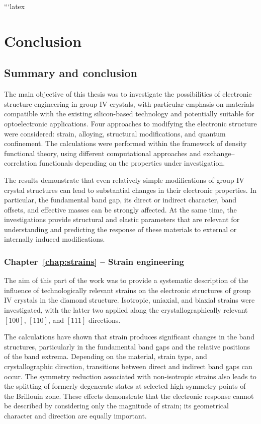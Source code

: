 ```latex
\chapter*{Conclusion}

\section*{Summary and conclusion}

The main objective of this thesis was to investigate the possibilities of electronic structure engineering in group IV crystals, with particular emphasis on materials compatible with the existing silicon-based technology and potentially suitable for optoelectronic applications. Four approaches to modifying the electronic structure were considered: strain, alloying, structural modifications, and quantum confinement. The calculations were performed within the framework of density functional theory, using different computational approaches and exchange--correlation functionals depending on the properties under investigation.

The results demonstrate that even relatively simple modifications of group IV crystal structures can lead to substantial changes in their electronic properties. In particular, the fundamental band gap, its direct or indirect character, band offsets, and effective masses can be strongly affected. At the same time, the investigations provide structural and elastic parameters that are relevant for understanding and predicting the response of these materials to external or internally induced modifications.

\subsection*{Chapter~\ref{chap:strains} -- Strain engineering}

The aim of this part of the work was to provide a systematic description of the influence of technologically relevant strains on the electronic structures of group IV crystals in the diamond structure. Isotropic, uniaxial, and biaxial strains were investigated, with the latter two applied along the crystallographically relevant $[100]$, $[110]$, and $[111]$ directions.

The calculations have shown that strain produces significant changes in the band structures, particularly in the fundamental band gaps and the relative positions of the band extrema. Depending on the material, strain type, and crystallographic direction, transitions between direct and indirect band gaps can occur. The symmetry reduction associated with non-isotropic strains also leads to the splitting of formerly degenerate states at selected high-symmetry points of the Brillouin zone. These effects demonstrate that the electronic response cannot be described by considering only the magnitude of strain; its geometrical character and direction are equally important.

